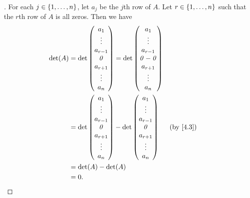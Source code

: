 \begin{proof}[]
	For each \(j \in \left\lbrace1, \dots, n\right\rbrace\), let \(a_j\) be the \(j\)th row of \(A\).
	Let \(r \in \left\lbrace1, \dots, n\right\rbrace\) such that the \(r\)th row of \(A\) is all zeros.
	Then we have
	\begin{align*}
		\det(A) & = \det\begin{pmatrix}
			                a_1       \\
			                \vdots    \\
			                a_{r - 1} \\
			                \zv       \\
			                a_{r + 1} \\
			                \vdots    \\
			                a_n
		                \end{pmatrix} = \det\begin{pmatrix}
			                                    a_1       \\
			                                    \vdots    \\
			                                    a_{r - 1} \\
			                                    \zv - \zv \\
			                                    a_{r + 1} \\
			                                    \vdots    \\
			                                    a_n
		                                    \end{pmatrix}              \\
		        & = \det\begin{pmatrix}
			                a_1       \\
			                \vdots    \\
			                a_{r - 1} \\
			                \zv       \\
			                a_{r + 1} \\
			                \vdots    \\
			                a_n
		                \end{pmatrix} - \det\begin{pmatrix}
			                                    a_1       \\
			                                    \vdots    \\
			                                    a_{r - 1} \\
			                                    \zv       \\
			                                    a_{r + 1} \\
			                                    \vdots    \\
			                                    a_n
		                                    \end{pmatrix} &  & \by{4.3} \\
		        & = \det(A) - \det(A)                                   \\
		        & = 0.
	\end{align*}
\end{proof}

